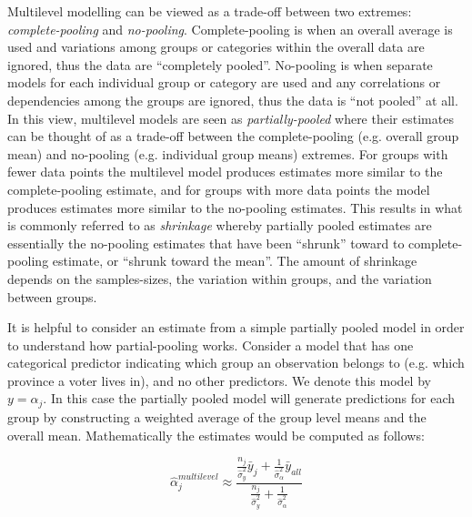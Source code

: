 Multilevel modelling can be viewed as a trade-off between two extremes: \textit{complete-pooling} and \textit{no-pooling}. Complete-pooling is when an overall average is used and variations among groups or categories within the overall data are ignored, thus the data are ``completely pooled''. No-pooling is when separate models for each individual group or category are used and any correlations or dependencies among the groups are ignored, thus the data is ``not pooled'' at all. In this view, multilevel models are seen as \textit{partially-pooled} where their estimates can be thought of as a trade-off between the complete-pooling (e.g. overall group mean) and no-pooling (e.g. individual group means) extremes. For groups with fewer data points the multilevel model produces estimates more similar to the complete-pooling estimate, and for groups with more data points the model produces estimates more similar to the no-pooling estimates. This results in what is commonly referred to as \textit{shrinkage} whereby partially pooled estimates are essentially the no-pooling estimates that have been “shrunk” toward to complete-pooling estimate, or ``shrunk toward the mean''. The amount of shrinkage depends on the samples-sizes, the variation within groups, and the variation between groups.

It is helpful to consider an estimate from a simple partially pooled model in order to understand how partial-pooling works. Consider a model that has one categorical predictor indicating which group an observation belongs to (e.g. which province a voter lives in), and no other predictors. We denote this model by $y = \alpha_j$. In this case the partially pooled model will generate predictions for each group by constructing a weighted average of the group level means and the overall mean. Mathematically the estimates would be computed as follows:

\begin{equation} \label{eq:mlm_ex}
\hat{\alpha}_j^{multilevel} \approx \frac{ \frac{n_j}{\hat{\sigma}_y^2} \bar{y}_j + \frac{1}{\hat{\sigma}_{\alpha}^2} \bar{y}_{all} }{ \frac{n_j}{\hat{\sigma}_y^2} + \frac{1}{\hat{\sigma}_{\alpha}^2} }
\end{equation}

